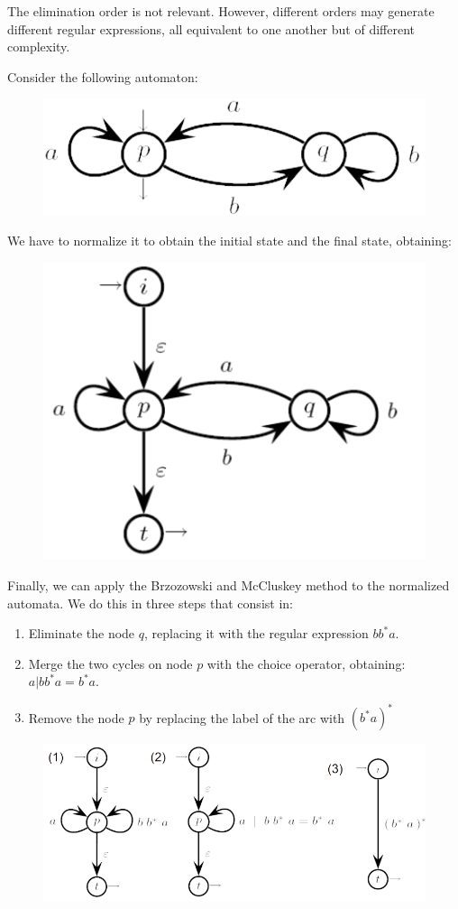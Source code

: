 The elimination order is not relevant.
However, different orders may generate different regular expressions, all equivalent to one another but of different complexity.
\begin{example}
    Consider the following automaton: 
    \begin{figure}[H]
        \centering
        \includegraphics[width=0.25\linewidth]{images/br1.png}
    \end{figure}
    We have to normalize it to obtain the initial state and the final state, obtaining: 
    \begin{figure}[H]
        \centering
        \includegraphics[width=0.25\linewidth]{images/br2.png}
    \end{figure}
    Finally, we can apply the Brzozowski and McCluskey method to the normalized automata.
    We do this in three steps that consist in: 
    \begin{enumerate}
        \item Eliminate the node $q$, replacing it with the regular expression $bb^{*}a$.
        \item Merge the two cycles on node $p$ with the choice operator, obtaining: $a|bb^{*}a=b^{*}a$. 
        \item Remove the node $p$ by replacing the label of the arc with $(b^{*}a)^{*}$
    \end{enumerate}
    \begin{figure}[H]
        \centering
        \includegraphics[width=0.5\linewidth]{images/br3.png}
    \end{figure}
\end{example}